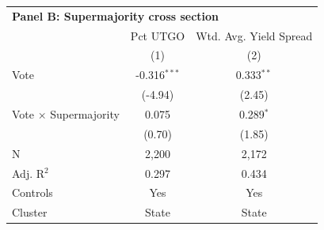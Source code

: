 \begingroup
\centering
\begin{tabular*}{\textwidth}{@{\extracolsep{\fill}}lcc}
\multicolumn{3}{l}{\textbf{Panel B: Supermajority cross section}}\\

\addlinespace
   \toprule
                                & Pct UTGO       & Wtd. Avg. Yield Spread\\  
                                & (1)            & (2)\\  
   \midrule 
   Vote                         & -0.316$^{***}$ & 0.333$^{**}$\\   
                                & (-4.94)       & (2.45)\\   
   Vote $\times$ Supermajority  & 0.075          & 0.289$^{*}$\\   
                                & (0.70)        & (1.85)\\   
   \hline
   N                 & 2,200          & 2,172\\  
   Adj. R$^2$               & 0.297          & 0.434\\  
   Controls                   & Yes            & Yes\\
   Cluster              & State & State\\  
   \bottomrule
\end{tabular*}
\par\endgroup
